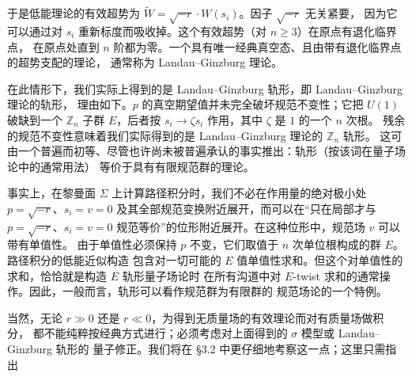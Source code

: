 \label{op:19}

于是低能理论的有效超势为 $\widetilde{W}=\sqrt{-r}\cdot W(s_i)$。因子 $\sqrt{-r}$ 无关紧要，
因为它可以通过对 $s_i$ 重新标度而吸收掉。这个有效超势（对 $n\ge3$）在原点有退化临界点，
在原点处直到 $n$ 阶都为零。一个具有唯一经典真空态、且由带有退化临界点的超势支配的理论，
通常称为 Landau--Ginzburg 理论。

在此情形下，我们实际上得到的是 Landau--Ginzburg 轨形，即 Landau--Ginzburg 理论的轨形，
理由如下。$p$ 的真空期望值并未完全破坏规范不变性；它把 $U(1)$ 破缺到一个
$\mathbb{Z}_n$ 子群 $E$，后者按 $s_i\to\zeta s_i$ 作用，其中 $\zeta$ 是 $1$ 的一个 $n$ 次根。
残余的规范不变性意味着我们实际得到的是 Landau--Ginzburg 理论的 $\mathbb{Z}_n$ 轨形。
这可由一个普遍而初等、尽管也许尚未被普遍承认的事实推出：轨形（按该词在量子场论中的通常用法）
等价于具有有限规范群的理论。

事实上，在黎曼面 $\Sigma$ 上计算路径积分时，我们不必在作用量的绝对极小处
$p=\sqrt{-r}$、$s_i=v=0$ 及其全部规范变换附近展开，而可以在“只在局部才与
$p=\sqrt{-r}$、$s_i=v=0$ 规范等价”的位形附近展开。在这种位形中，规范场 $v$ 可以带有单值性。
由于单值性必须保持 $p$ 不变，它们取值于 $n$ 次单位根构成的群 $E$。路径积分的低能近似构造
包含对一切可能的 $E$ 值单值性求和。但这个对单值性的求和，恰恰就是构造 $E$ 轨形量子场论时
在所有沟道中对 $E$-twist 求和的通常操作。因此，一般而言，轨形可以看作规范群为有限群的
规范场论的一个特例。

当然，无论 $r\gg0$ 还是 $r\ll0$，为得到无质量场的有效理论而对有质量场做积分，
都不能纯粹按经典方式进行；必须考虑对上面得到的 $\sigma$ 模型或 Landau--Ginzburg 轨形的
量子修正。我们将在 §3.2 中更仔细地考察这一点；这里只需指出%
